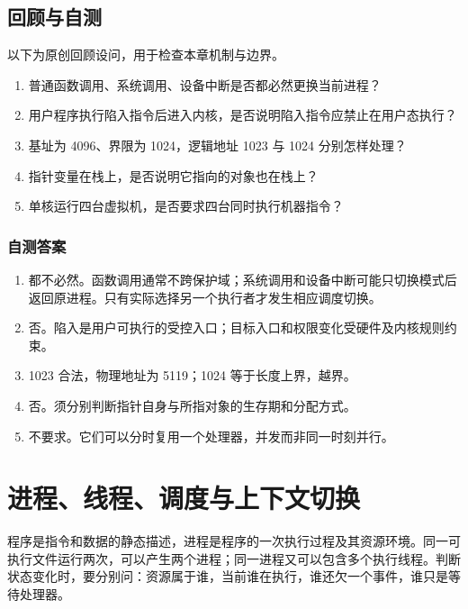 \section{回顾与自测}\label{os-1-review}

以下为原创回顾设问，用于检查本章机制与边界。

\begin{enumerate}
\def\labelenumi{\arabic{enumi}.}
\tightlist
\item
  普通函数调用、系统调用、设备中断是否都必然更换当前进程？
\item
  用户程序执行陷入指令后进入内核，是否说明陷入指令应禁止在用户态执行？
\item
  基址为 4096、界限为 1024，逻辑地址 1023 与 1024 分别怎样处理？
\item
  指针变量在栈上，是否说明它指向的对象也在栈上？
\item
  单核运行四台虚拟机，是否要求四台同时执行机器指令？
\end{enumerate}

\subsection{自测答案}\label{os-c01-h190}

\begin{enumerate}
\def\labelenumi{\arabic{enumi}.}
\tightlist
\item
  都不必然。函数调用通常不跨保护域；系统调用和设备中断可能只切换模式后返回原进程。只有实际选择另一个执行者才发生相应调度切换。
\item
  否。陷入是用户可执行的受控入口；目标入口和权限变化受硬件及内核规则约束。
\item
  1023 合法，物理地址为 5119；1024 等于长度上界，越界。
\item
  否。须分别判断指针自身与所指对象的生存期和分配方式。
\item
  不要求。它们可以分时复用一个处理器，并发而非同一时刻并行。
\end{enumerate}

\chapter{进程、线程、调度与上下文切换}\label{os-ch2}

程序是指令和数据的静态描述，进程是程序的一次执行过程及其资源环境。同一可执行文件运行两次，可以产生两个进程；同一进程又可以包含多个执行线程。判断状态变化时，要分别问：资源属于谁，当前谁在执行，谁还欠一个事件，谁只是等待处理器。

